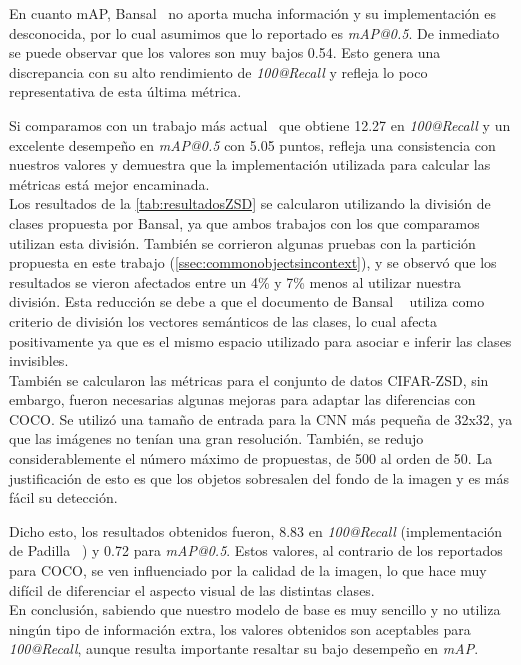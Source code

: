 En cuanto mAP, Bansal\etal~\cite{bansal2018zero} no aporta mucha información y su implementación es desconocida, por lo cual asumimos que lo reportado es \textit{mAP@0.5}. De inmediato se puede observar que los valores son muy bajos 0.54. Esto genera una discrepancia con su alto rendimiento de \textit{100@Recall} y refleja lo poco representativa de esta última métrica. 

Si comparamos con un trabajo más actual~\cite{rahman2020zero} que obtiene 12.27 en \textit{100@Recall} y un excelente desempeño en \textit{mAP@0.5} con 5.05 puntos, refleja una consistencia con nuestros valores y demuestra que la implementación utilizada para calcular las métricas está mejor encaminada.\\


Los resultados de la \autoref{tab:resultadosZSD} se calcularon utilizando la división de clases propuesta por Bansal, ya que ambos trabajos con los que comparamos utilizan esta división. También se corrieron algunas pruebas con la partición propuesta en este trabajo (\autoref{ssec:commonobjectsincontext}), y se observó que los resultados se vieron afectados entre un 4\% y 7\% menos al utilizar nuestra división. Esta reducción se debe a que el documento de Bansal \etal~\cite{bansal2018zero} utiliza como criterio de división los vectores semánticos de las clases, lo cual afecta positivamente ya que es el mismo espacio utilizado para asociar e inferir las clases invisibles.\\

También se calcularon las métricas para el conjunto de datos CIFAR-ZSD, sin embargo, fueron necesarias algunas mejoras para adaptar las diferencias con COCO. Se utilizó una tamaño de entrada para la CNN más pequeña de 32x32, ya que las imágenes no tenían una gran resolución. También, se redujo considerablemente el número máximo de propuestas, de 500 al orden de 50. La justificación de esto es que los objetos sobresalen del fondo de la imagen y es más fácil su detección.

Dicho esto, los resultados obtenidos fueron, 8.83 en \textit{100@Recall} (implementación de Padilla \etal~\cite{padilla2020survey}) y 0.72 para \textit{mAP@0.5}. Estos valores, al contrario de los reportados para COCO, se ven influenciado por la calidad de la imagen, lo que hace muy difícil de diferenciar el aspecto visual de las distintas clases.\\

En conclusión, sabiendo que nuestro modelo de base es muy sencillo y no utiliza ningún tipo de información extra, los valores obtenidos son aceptables para \textit{100@Recall}, aunque resulta importante resaltar su bajo desempeño en \textit{mAP}. 

